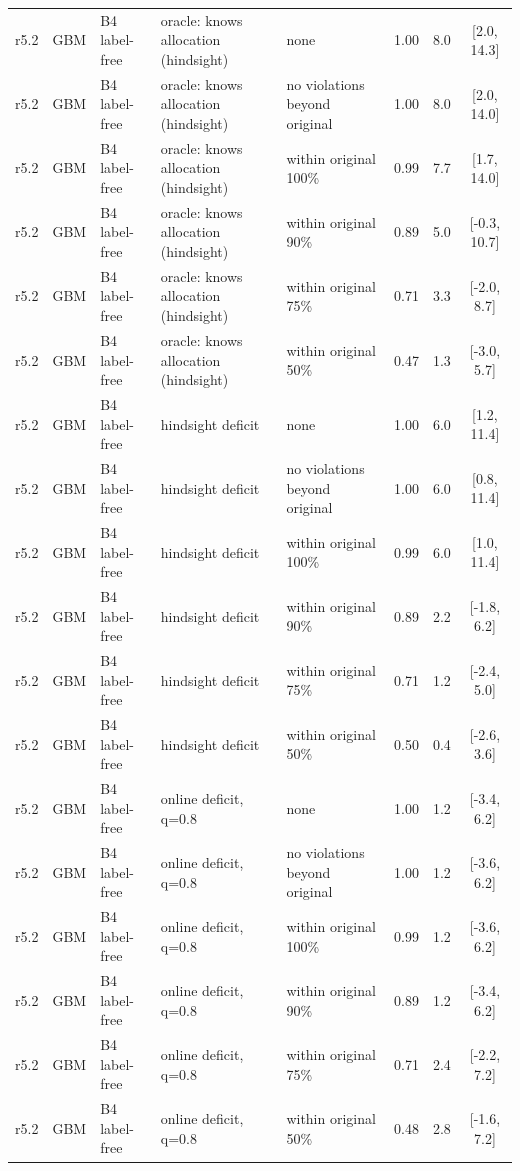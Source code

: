 \begin{longtable}{lllp{4.2cm}p{3.4cm}ccc}
r5.2 & GBM & B4 label-free & oracle: knows allocation (hindsight) & none & 1.00 & 8.0 & [2.0, 14.3] \\
r5.2 & GBM & B4 label-free & oracle: knows allocation (hindsight) & no violations beyond original & 1.00 & 8.0 & [2.0, 14.0] \\
r5.2 & GBM & B4 label-free & oracle: knows allocation (hindsight) & within original 100\% & 0.99 & 7.7 & [1.7, 14.0] \\
r5.2 & GBM & B4 label-free & oracle: knows allocation (hindsight) & within original 90\% & 0.89 & 5.0 & [-0.3, 10.7] \\
r5.2 & GBM & B4 label-free & oracle: knows allocation (hindsight) & within original 75\% & 0.71 & 3.3 & [-2.0, 8.7] \\
r5.2 & GBM & B4 label-free & oracle: knows allocation (hindsight) & within original 50\% & 0.47 & 1.3 & [-3.0, 5.7] \\
r5.2 & GBM & B4 label-free & hindsight deficit & none & 1.00 & 6.0 & [1.2, 11.4] \\
r5.2 & GBM & B4 label-free & hindsight deficit & no violations beyond original & 1.00 & 6.0 & [0.8, 11.4] \\
r5.2 & GBM & B4 label-free & hindsight deficit & within original 100\% & 0.99 & 6.0 & [1.0, 11.4] \\
r5.2 & GBM & B4 label-free & hindsight deficit & within original 90\% & 0.89 & 2.2 & [-1.8, 6.2] \\
r5.2 & GBM & B4 label-free & hindsight deficit & within original 75\% & 0.71 & 1.2 & [-2.4, 5.0] \\
r5.2 & GBM & B4 label-free & hindsight deficit & within original 50\% & 0.50 & 0.4 & [-2.6, 3.6] \\
r5.2 & GBM & B4 label-free & online deficit, q=0.8 & none & 1.00 & 1.2 & [-3.4, 6.2] \\
r5.2 & GBM & B4 label-free & online deficit, q=0.8 & no violations beyond original & 1.00 & 1.2 & [-3.6, 6.2] \\
r5.2 & GBM & B4 label-free & online deficit, q=0.8 & within original 100\% & 0.99 & 1.2 & [-3.6, 6.2] \\
r5.2 & GBM & B4 label-free & online deficit, q=0.8 & within original 90\% & 0.89 & 1.2 & [-3.4, 6.2] \\
r5.2 & GBM & B4 label-free & online deficit, q=0.8 & within original 75\% & 0.71 & 2.4 & [-2.2, 7.2] \\
r5.2 & GBM & B4 label-free & online deficit, q=0.8 & within original 50\% & 0.48 & 2.8 & [-1.6, 7.2] \\

\end{longtable}
